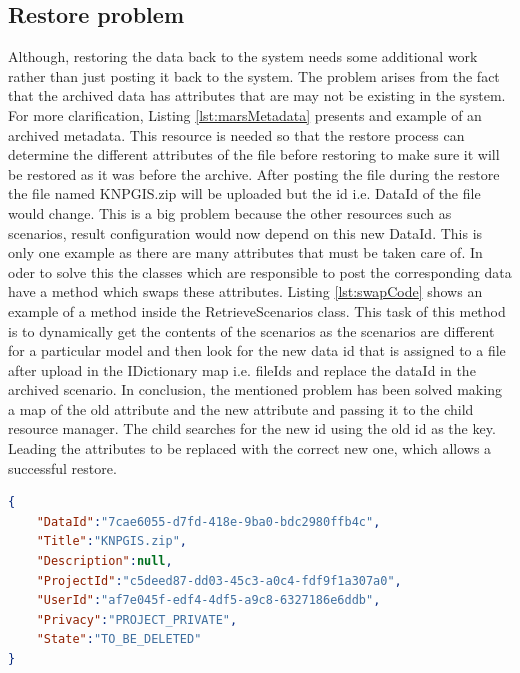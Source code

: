 \subsection{Restore problem}
\label{subsec:restoreProb}
Although, restoring the data back to the system needs some additional work rather than just posting it back to the system. The problem
arises from the fact that the archived data has attributes that are may not be existing in the system. For more clarification, Listing \ref{lst:marsMetadata} 
presents and example of an archived metadata. This resource is needed so that the restore process can determine the different attributes of the file
before restoring to make sure it will be restored as it was before the archive. After posting the file during the restore the file named KNPGIS.zip will 
be uploaded but the id i.e. DataId of the file would change. This is a big problem because the other resources such as scenarios, result configuration would now
depend on this new DataId. This is only one example as there are many attributes that must be taken care of. In oder to solve this the classes which are responsible
to post the corresponding data have a method which swaps these attributes. Listing \ref{lst:swapCode} shows an example of a method inside the RetrieveScenarios class.
This task of this method is to dynamically get the contents of the scenarios as the scenarios are different for a particular model and then look for the new data id
that is assigned to a file after upload in the IDictionary map i.e. fileIds and replace the dataId in the archived scenario. In conclusion, the mentioned problem
has been solved making a map of the old attribute and the new attribute and passing it to the child resource manager. The child searches for the new id using the 
old id as the key. Leading the attributes to be replaced with the correct new one, which allows a successful restore.

\par

\begin{lstlisting}[caption={Archived MARS metadata resource}, language=json,firstnumber=1, captionpos=b, label={lst:marsMetadata}]
{
    "DataId":"7cae6055-d7fd-418e-9ba0-bdc2980ffb4c",
    "Title":"KNPGIS.zip",
    "Description":null,
    "ProjectId":"c5deed87-dd03-45c3-a0c4-fdf9f1a307a0",
    "UserId":"af7e045f-edf4-4df5-a9c8-6327186e6ddb",
    "Privacy":"PROJECT_PRIVATE",
    "State":"TO_BE_DELETED"
}
\end{lstlisting}

